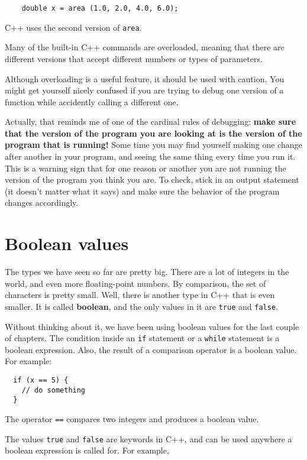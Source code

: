 \begin{verbatim}
    double x = area (1.0, 2.0, 4.0, 6.0);
\end{verbatim}
%
C++ uses the second version of {\tt area}.  

Many of the built-in C++ commands are overloaded, meaning that there
are different versions that accept different numbers or types of
parameters.

Although overloading is a useful feature, it should be used with
caution.  You might get yourself nicely confused if you are trying to
debug one version of a function while accidently calling a different
one.

Actually, that reminds me of one of the cardinal rules of debugging:
{\bf make sure that the version of the program you are looking at is
the version of the program that is running!}  Some time you may find
yourself making one change after another in your program, and seeing
the same thing every time you run it.  This is a warning sign that for
one reason or another you are not running the version of the program
you think you are.  To check, stick in an output statement (it
doesn't matter what it says) and make sure the behavior of the
program changes accordingly.

\section{Boolean values}

The types we have seen so far are pretty big.  There are a lot
of integers in the world, and even more floating-point numbers.
By comparison, the set of characters is pretty small.  Well, there
is another type in C++ that is even smaller.  It is called
{\bf boolean}, and the only values in it are
{\tt true} and {\tt false}.

Without thinking about it, we have been using boolean values for the
last couple of chapters.  The condition inside an {\tt if}
statement or a {\tt while} statement is a boolean expression.
Also, the result of a comparison operator is a boolean value.
For example:

\begin{verbatim}
  if (x == 5) {
    // do something
  }
\end{verbatim}
%
The operator {\tt ==} compares two integers and produces a
boolean value.


The values {\tt true} and {\tt false} are keywords in C++,
and can be used anywhere a boolean expression is called for.
For example, 

